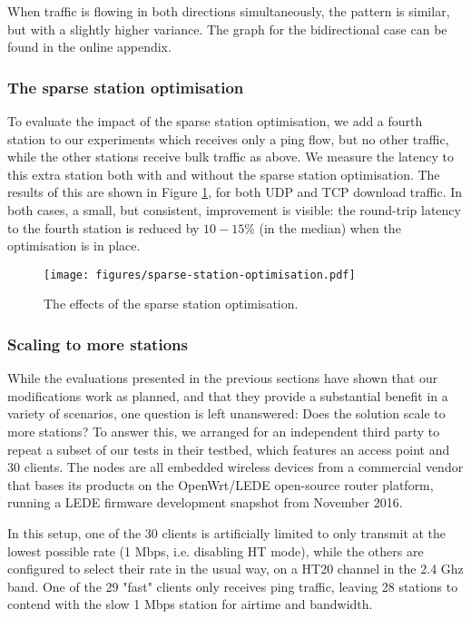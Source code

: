 \documentclass[english]{scrartcl}
\begin{document}
When traffic is flowing in both directions simultaneously, the pattern is
similar, but with a slightly higher variance. The graph for the bidirectional
case can be found in the online appendix.

\subsubsection{The sparse station optimisation}
\label{sec:sparse}
To evaluate the impact of the sparse station optimisation, we add a fourth
station to our experiments which receives only a ping flow, but no other
traffic, while the other stations receive bulk traffic as above. We measure the
latency to this extra station both with and without the sparse station
optimisation. The results of this are shown in Figure \ref{fig:sparse-stations}, for
both UDP and TCP download traffic. In both cases, a small, but consistent,
improvement is visible: the round-trip latency to the fourth station is reduced
by \(10-15\%\) (in the median) when the optimisation is in place.

\begin{figure}[htbp]
\centering
\texttt{[image: figures/sparse-station-optimisation.pdf]}
\caption{\label{fig:sparse-stations}
The effects of the sparse station optimisation.}
\end{figure}

\subsubsection{Scaling to more stations}
\label{sec:org60227d2}
While the evaluations presented in the previous sections have shown that our
modifications work as planned, and that they provide a substantial benefit in a
variety of scenarios, one question is left unanswered: Does the solution scale
to more stations? To answer this, we arranged for an independent third party to
repeat a subset of our tests in their testbed, which features an access point
and 30 clients. The nodes are all embedded wireless devices from a commercial
vendor that bases its products on the OpenWrt/LEDE open-source router platform,
running a LEDE firmware development snapshot from November 2016.

In this setup, one of the 30 clients is artificially limited to only transmit at
the lowest possible rate (1 Mbps, i.e. disabling HT mode), while the others are
configured to select their rate in the usual way, on a HT20 channel in the 2.4
Ghz band. One of the 29 "fast" clients only receives ping traffic, leaving 28
stations to contend with the slow 1 Mbps station for airtime and bandwidth.
\end{document}
